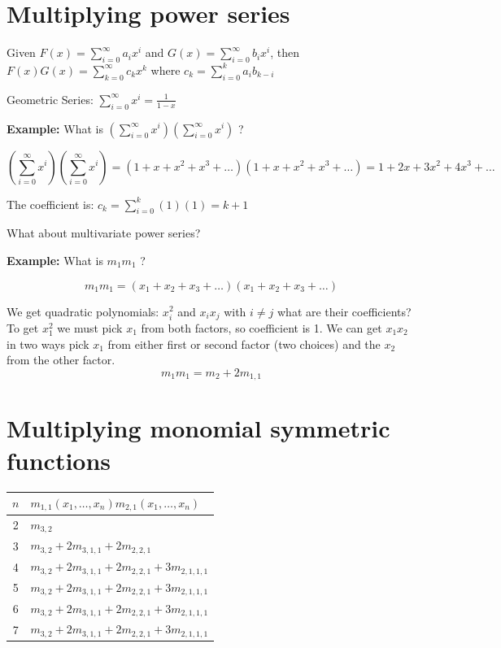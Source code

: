 \documentclass[12pt]{memoir}
\begin{document}
\newpage

\section{Multiplying power series}

Given $F(x) = \sum_{i=0}^\infty a_i x^i$ and $G(x) = \sum_{i=0}^\infty b_i x^i$, then $F(x)G(x) = \sum_{k=0}^\infty c_k x^k$ where $c_k = \sum_{i=0}^k a_i b_{k-i}$

Geometric Series: $\sum_{i=0}^\infty x^i = \frac{1}{1 - x}$

\textcolor{verdeUCR}{\textbf{Example:}} What is $\left( \sum_{i=0}^\infty x^i \right)\left( \sum_{i=0}^\infty x^i \right)$ ?

\[
\left( \sum_{i=0}^\infty x^i \right)\left( \sum_{i=0}^\infty x^i \right) = (1 + x + x^2 + x^3 + \dots)(1 + x + x^2 + x^3 + \dots) = 1 + 2x + 3x^2 + 4x^3 + \dots
\]

The coefficient is: $c_k = \sum_{i=0}^k (1)(1) = k + 1$

What about multivariate power series?

\textcolor{verdeUCR}{\textbf{Example:}} What is $m_1 m_1$ ?

\[
m_1 m_1 = (x_1 + x_2 + x_3 + \dots)(x_1 + x_2 + x_3 + \dots)
\]

We get quadratic polynomials: $x_i^2$ and $x_i x_j$ with $i \neq j$ what are their coefficients?\\
To get $x_1^2$ we must pick $x_1$ from both factors, so coefficient is 1. We can get $x_1 x_2$ in two ways pick $x_1$ from either first or second factor (two choices) and the $x_2$ from the other factor.
\[
m_1 m_1 = m_2 + 2m_{1,1}
\]

\newpage

\section{Multiplying monomial symmetric functions}

\begin{center}
\begin{tabular}{c|l}
$n$ & $m_{1,1}(x_1, \dots, x_n) m_{2,1}(x_1, \dots, x_n)$ \\
\hline
2 & $m_{3,2}$ \\
3 & $m_{3,2} + 2m_{3,1,1} + 2m_{2,2,1}$ \\
4 & $m_{3,2} + 2m_{3,1,1} + 2m_{2,2,1} + 3m_{2,1,1,1}$ \\
5 & $m_{3,2} + 2m_{3,1,1} + 2m_{2,2,1} + 3m_{2,1,1,1}$ \\
6 & $m_{3,2} + 2m_{3,1,1} + 2m_{2,2,1} + 3m_{2,1,1,1}$ \\
7 & $m_{3,2} + 2m_{3,1,1} + 2m_{2,2,1} + 3m_{2,1,1,1}$
\end{tabular}
\end{center}
\end{document}
